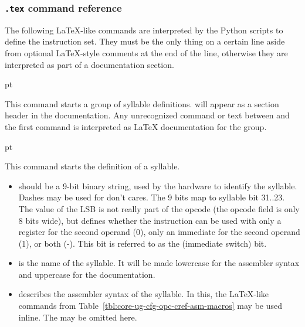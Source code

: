 \subsubsection[.tex command reference]{\texttt{.tex} command reference}
\label{sec:core-ug-cfg-opc-cref}

The following LaTeX-like commands are interpreted by the Python scripts to 
define the instruction set. They must be the only thing on a certain line aside 
from optional LaTeX-style comments at the end of the line, otherwise they are 
interpreted as part of a documentation section.

 pt

\noindent This command starts a group of syllable definitions.  
will appear as a section header in the documentation. Any unrecognized command 
or text between \code{\section} and the first \code{\syllable} command is 
interpreted as LaTeX documentation for the group.

 pt

\noindent This command starts the definition of a syllable.

\begin{itemize}

\item {} should be a 9-bit binary string, used by the hardware to 
      identify the syllable. Dashes may be used for don't cares. The 9 bits map
      to syllable bit 31..23. The value of the LSB is not really part of the
      opcode (the opcode field is only 8 bits wide), but defines whether the
      instruction can be used with only a register for the second operand (0),
      only an immediate for the second operand (1), or both (-). This bit is
      referred to as the  (immediate switch) bit.

\item {} is the name of the syllable. It will be made lowercase
      for the assembler syntax and uppercase for the documentation.
   
\item {} describes the assembler syntax of the syllable. In this, 
      the LaTeX-like commands from Table~\ref{tbl:core-ug-cfg-opc-cref-asm-macros}
      may be used inline. The \code{{}} may be omitted here.

\end{itemize}

